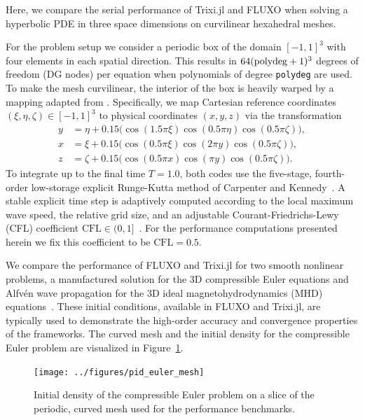 \documentclass[hidelinks]{juliacon} %
\newcommand{\trixi}{Trixi.jl\xspace}
\begin{document}
Here, we compare the serial performance of \trixi and FLUXO when solving a
hyperbolic PDE in three space dimensions on curvilinear hexahedral meshes.

For the problem setup we consider a periodic box of the domain $[-1,1]^3$ with four elements in each
spatial direction. This results in $64 (\text{\lstinline{polydeg}}+1)^3$ degrees
of freedom (DG nodes) per equation when polynomials of degree \lstinline{polydeg} are used.
To make the mesh curvilinear, the interior of the box is heavily warped by
a mapping adapted from \cite{chan2019efficient}.
Specifically, we map Cartesian reference coordinates $(\xi, \eta, \zeta) \in [-1, 1]^3$
to physical coordinates $(x, y, z)$ via the transformation
\begin{equation}
\begin{aligned}
  y &= \eta  + 0.15 \bigl( \cos(1.5 \pi \xi) \cos(0.5 \pi \eta) \cos(0.5 \pi \zeta) \bigr),
  \\
  x &= \xi   + 0.15 \bigl( \cos(0.5 \pi \xi) \cos(2 \pi y) \cos(0.5 \pi \zeta) \bigr),
  \\
  z &= \zeta + 0.15 \bigl( \cos(0.5 \pi x) \cos(\pi y) \cos(0.5 \pi \zeta) \bigr).
\end{aligned}
\end{equation}
To integrate up to the
final time $T=1.0$, both codes use the five-stage, fourth-order low-storage explicit
Runge-Kutta method of Carpenter and Kennedy~\cite{CarpenterKennedy1994}.
A stable explicit time step is adaptively computed according to the local maximum wave
speed, the relative grid size, and an adjustable Courant-Friedrichs-Lewy (CFL)
coefficient $\text{CFL}\in(0,1]$~\cite{gassner2011}. For the performance computations presented herein
we fix this coefficient to be $\text{CFL}=0.5$.

We compare the performance of FLUXO and \trixi for two smooth nonlinear problems,
a manufactured solution for the 3D compressible Euler equations and Alfv\'{e}n wave propagation for
the 3D ideal magnetohydrodynamics (MHD) equations~\cite{gassner2009,altmann2012}. These initial conditions, available in FLUXO and
\trixi, are typically used to demonstrate the high-order accuracy and convergence properties
of the frameworks.
The curved mesh and the initial density for the compressible Euler problem are
visualized in Figure~\ref{fig:pid_euler_mesh}.

\begin{figure}[!h]
\centering
  \texttt{[image: ../figures/pid\_euler\_mesh]}
  \caption{Initial density of the compressible Euler problem on a slice of the
           periodic, curved mesh used for the performance benchmarks.}
  \label{fig:pid_euler_mesh}
\end{figure}
\end{document}

